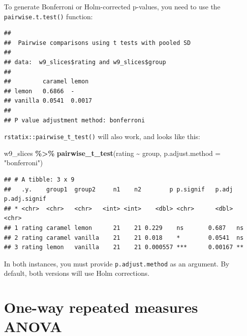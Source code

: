 \documentclass[
]{book}
\newenvironment{Shaded}{\begin{snugshade}}{\end{snugshade}}
\newcommand{\AttributeTok}[1]{\textcolor[rgb]{0.13,0.29,0.53}{#1}}
\newcommand{\FunctionTok}[1]{\textcolor[rgb]{0.13,0.29,0.53}{\textbf{#1}}}
\newcommand{\NormalTok}[1]{#1}
\newcommand{\SpecialCharTok}[1]{\textcolor[rgb]{0.81,0.36,0.00}{\textbf{#1}}}
\newcommand{\StringTok}[1]{\textcolor[rgb]{0.31,0.60,0.02}{#1}}
\begin{document}
To generate Bonferroni or Holm-corrected p-values, you need to use the \texttt{pairwise.t.test()} function:

\begin{Shaded}
\end{Shaded}

\begin{verbatim}
## 
##  Pairwise comparisons using t tests with pooled SD 
## 
## data:  w9_slices$rating and w9_slices$group 
## 
##         caramel lemon 
## lemon   0.6866  -     
## vanilla 0.0541  0.0017
## 
## P value adjustment method: bonferroni
\end{verbatim}

\texttt{rstatix::pairwise\_t\_test()} will also work, and looks like this:

\begin{Shaded}
\begin{Highlighting}[]
\NormalTok{w9\_slices }\SpecialCharTok{\%\textgreater{}\%}
  \FunctionTok{pairwise\_t\_test}\NormalTok{(rating }\SpecialCharTok{\textasciitilde{}}\NormalTok{ group, }\AttributeTok{p.adjust.method =} \StringTok{"bonferroni"}\NormalTok{)}
\end{Highlighting}
\end{Shaded}

\begin{verbatim}
## # A tibble: 3 x 9
##   .y.    group1  group2     n1    n2        p p.signif   p.adj p.adj.signif
## * <chr>  <chr>   <chr>   <int> <int>    <dbl> <chr>      <dbl> <chr>       
## 1 rating caramel lemon      21    21 0.229    ns       0.687   ns          
## 2 rating caramel vanilla    21    21 0.018    *        0.0541  ns          
## 3 rating lemon   vanilla    21    21 0.000557 ***      0.00167 **
\end{verbatim}

In both instances, you must provide \texttt{p.adjust.method} as an argument. By default, both versions will use Holm corrections.

\hypertarget{one-way-repeated-measures-anova}{%
\section{One-way repeated measures ANOVA}\label{one-way-repeated-measures-anova}}
\end{document}
